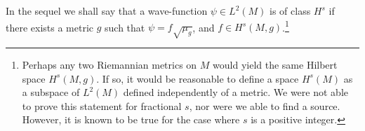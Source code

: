 \documentclass[12pt]{amsart}
\begin{document}
In the sequel we shall say that a wave-function $\psi \in L^2(M)$ is of class $H^s$ if there exists
a metric $g$ such that $\psi = f \sqrt{\mu_g}$, and $f \in H^s(M,g)$.\footnote{Perhaps any two Riemannian metrics on $M$
would yield the same Hilbert space $H^s(M,g)$.
If so, it would be reasonable to define a space $H^s(M)$ as a subspace of $L^2(M)$ defined independently of a metric.
We were not able to prove this statement for fractional $s$, nor were we able to find a source.
However, it is known to be true for the case where $s$ is a positive integer.} 

%

\end{document}

